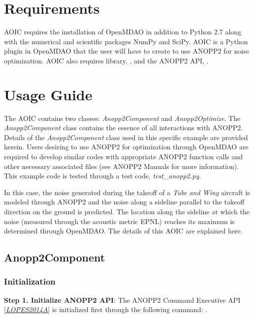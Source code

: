\documentclass[letterpaper,10pt,english]{sphinxmanual}
\begin{document}
\chapter{Requirements}
\label{requirements:requirements}\label{requirements::doc}
\textsc{AOIC} requires the installation of OpenMDAO in addition to Python 2.7 along with the numerical and scientific packages NumPy and SciPy. AOIC is a Python plugin in OpenMDAO that the user will have to create to use ANOPP2 for noise optimization. AOIC also requires library, , and the ANOPP2 API, .


\chapter{Usage Guide}
\label{usage:usage-guide}\label{usage::doc}
The \textsc{AOIC} contains two classes: \emph{Anopp2Component} and \emph{Anopp2Optimize}.
The \emph{Anopp2Component} class contains the essence of all interactions with ANOPP2.
Details of the \emph{Anopp2Component} class used in this specific example are provided herein.
Users desiring to use ANOPP2 for optimization through OpenMDAO are required to develop similar codes with appropriate ANOPP2 function calls and other necessary associated files (see ANOPP2 Manuals for more information).
This example code is tested through a test code, \emph{test\_anopp2.py}.

In this case, the noise generated during the takeoff of a \emph{Tube and Wing} aircraft is modeled through ANOPP2 and the noise along a sideline parallel to the takeoff direction on the ground is predicted.
The location along the sideline at which the noise (measured through the acoustic metric \textsc{EPNL}) reaches its maximum is determined through OpenMDAO.
The details of this \textsc{AOIC} are explained here.


\section{Anopp2Component}
\label{usage:anopp2component}

\subsection{Initialization}
\label{usage:initialization}
\textbf{Step 1. Initialize ANOPP2 API}: The ANOPP2 Command Executive API {[}{\hyperref[usage:lopes2014a]{\emph{LOPES2014A}}}{]} is initialized first through the following command: .
\end{document}
